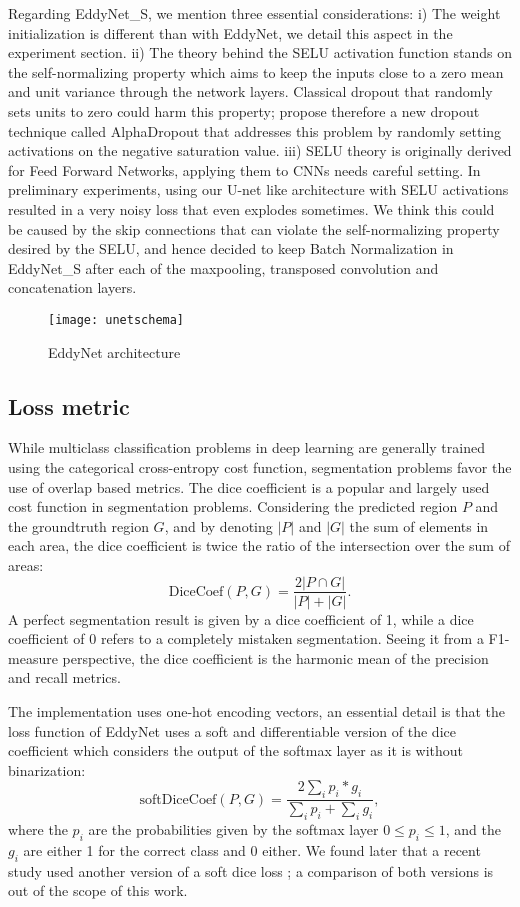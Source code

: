\documentclass[journal]{IEEEtran}
\begin{document}
Regarding EddyNet\_S, we mention three essential considerations: i) The weight initialization is different than with EddyNet, we detail this aspect in the experiment section. ii) The theory behind the SELU activation function stands on the self-normalizing property which aims to keep the inputs close to a zero mean and unit variance through the network layers. Classical dropout that randomly sets units to zero could harm this property; \cite{klambauer2017self} propose therefore a new dropout technique called AlphaDropout that addresses this problem by randomly setting activations on the negative saturation value. iii) SELU theory is originally derived for Feed Forward Networks, applying them to CNNs needs careful setting. In preliminary experiments, using our U-net like architecture with SELU activations resulted in a very noisy loss that even explodes sometimes. We think this could be caused by the skip connections that can violate the self-normalizing property desired by the SELU, and hence decided to keep Batch Normalization in EddyNet\_S after each of the maxpooling, transposed convolution and concatenation layers. 

\begin{figure}[t]
\centering
\texttt{[image: unetschema]}
\caption{EddyNet architecture}
\label{fig:eddynet}
\end{figure}

\subsection{Loss metric}
While multiclass classification problems in deep learning are generally trained using the categorical cross-entropy cost function, segmentation problems favor the use of overlap based metrics. The dice coefficient is a popular and largely used cost function in segmentation problems. Considering the predicted region $P$ and the groundtruth region $G$, and by denoting $|P|$ and $|G|$ the sum of elements in each area, the dice coefficient is twice the ratio of the intersection over the sum of areas:
\begin{equation}
\text{DiceCoef}(P,G)=\frac{2 |P \cap G|}{|P|+ |G|}.
\end{equation}
 A perfect segmentation result is given by a dice coefficient of 1, while a dice coefficient of 0 refers to a completely mistaken segmentation. Seeing it from a F1-measure perspective, the dice coefficient is the harmonic mean of the precision and recall metrics.

The implementation uses one-hot encoding vectors, an essential detail is that the loss function of EddyNet uses a soft and differentiable version of the dice coefficient which considers the output of the softmax layer as it is without binarization:
\begin{equation}
\text{softDiceCoef}(P,G)=\frac{2 \sum_i p_i * g_i}{\sum_i p_i+ \sum_i g_i},
\end{equation}
where the $p_i$ are the probabilities given by the softmax layer $0\leq p_i \leq 1$, and the $g_i$ are either 1 for the correct class and 0 either. We found later that a recent study used another version of a soft dice loss \cite{milletari2016v}; a comparison of both versions is out of the scope of this work.
\end{document}
